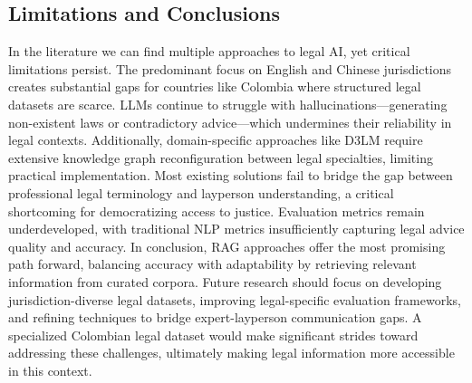 \subsection{Limitations and Conclusions}
In the literature we can find multiple approaches to legal AI, yet critical limitations persist. 
The predominant focus on English and Chinese jurisdictions creates substantial gaps for 
countries like Colombia where structured legal datasets are scarce. LLMs continue to 
struggle with hallucinations—generating non-existent laws or contradictory advice—which 
undermines their reliability in legal contexts. Additionally, domain-specific approaches 
like D3LM require extensive knowledge graph reconfiguration between legal specialties, 
limiting practical implementation.
Most existing solutions fail to bridge the gap between professional legal terminology 
and layperson understanding, a critical shortcoming for democratizing access to justice. 
Evaluation metrics remain underdeveloped, with traditional NLP metrics insufficiently 
capturing legal advice quality and accuracy.
In conclusion, RAG approaches offer the most promising path forward, balancing accuracy 
with adaptability by retrieving relevant information from curated corpora. 
Future research should focus on developing jurisdiction-diverse legal datasets, improving 
legal-specific evaluation frameworks, and refining techniques to bridge expert-layperson 
communication gaps. A specialized Colombian legal dataset would make significant strides 
toward addressing these challenges, ultimately making legal information more accessible in 
this context.
